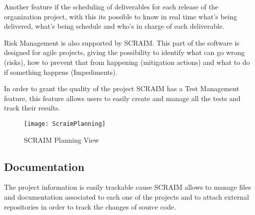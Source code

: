 Another feature if the scheduling of deliverables for each release of the organization project, with this its possible to know in real time what's being delivered, what's being schedule and who's in charge of each deliverable.

Risk Management is also supported by SCRAIM. This part of the software is designed for agile projects, giving the possibility to identify what can go wrong (risks), how to prevent that from happening (mitigation actions) and what to do if something happens (Impediments). 

In order to grant the quality of the project SCRAIM has a Test Management feature, this feature allows users to easily create and manage all the tests and track their results.

\begin{figure}[h]
	\begin{center}
		\leavevmode
		\texttt{[image: ScraimPlanning]}
		\caption{SCRAIM Planning View}
		\label{fig:scraimplanning}
	\end{center}
\end{figure}


\subsection{Documentation}

The project information is easily trackable cause SCRAIM allows  to manage files and documentation associated to each one of the projects and to attach external repositories in order to track the changes of source code.